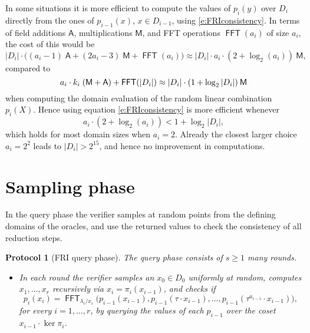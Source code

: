 \documentclass[11pt,article,oneside]{memoir}
\newtheorem{protocol}[]{Protocol}
\theoremstyle{definition}
\theoremstyle{remark}
\DeclareMathOperator{\FFT}{\mathsf{FFT}}
\begin{document}
In some situations it is more efficient to compute the values of $p_i(y)$ over $D_i$ directly from the ones of $p_{i-1}(x)$, $x\in D_{i-1}$, using \eqref{e:FRIconsistency}. 
In terms of field additions $\mathsf A$, multiplications $\mathsf M$,  and FFT operations $\FFT(a_i)$ of size $a_i$, 
the cost of this would be
\[
|D_i|\cdot \big((a_i-1) \;\mathsf A + (2 a_i - 3)\;\mathsf{M}  + \FFT(a_i)\big)\approx |D_i|\cdot a_i\cdot (2 + \log_2(a_i))\: \mathsf{M},
\]
compared to 
\[
a_i \cdot k_i \; (\mathsf M + \mathsf A) + 
\FFT(|D_i|) \approx |D_i|\cdot (1 + \log_2 |D_i|) \:\textsf M
\] 
when computing the domain evaluation of the random linear combination $p_i(X)$.
Hence using equation \eqref{e:FRIconsistency} is more efficient whenever
\begin{equation}
a_i\cdot (2 + \log_2(a_i)) < 1 + \log_2 |D_i|,
\end{equation}
which holds for most domain sizes when $a_i=2$. 
Already the closest larger choice $a_i = 2^2$ leads to $|D_i|>2^{15}$, and hence no improvement in computations.
 
\section{Sampling phase}

In the query phase the verifier samples at random points from the defining domains of the oracles, and use the returned values to check the consistency of all reduction steps.
\begin{protocol}[FRI query phase]
The query phase consists of $s\geq 1$ many rounds. 
\begin{itemize}
\item
In each round the verifier samples an $x_0 \in D_0$ uniformly at random, computes $x_1, \ldots, x_r$ recursively via  $x_{i}=\pi_{i}(x_{i-1})$, and checks if
\[
p_i(x_i)= \FFT_{\lambda_i / x_i}\big(p_{i-1}(x_{i-1}), p_{i-1}(\tau\cdot x_{i-1}), \ldots, p_{i-1}(\tau^{a_{i-1}}\cdot x_{i-1})\big),
\]
for every $i=1,\ldots,r$, by querying  the values of each $p_{i-1}$  over the coset $x_{i-1}\cdot\ker\pi_i$.
\end{itemize}
\end{protocol}
\end{document}
